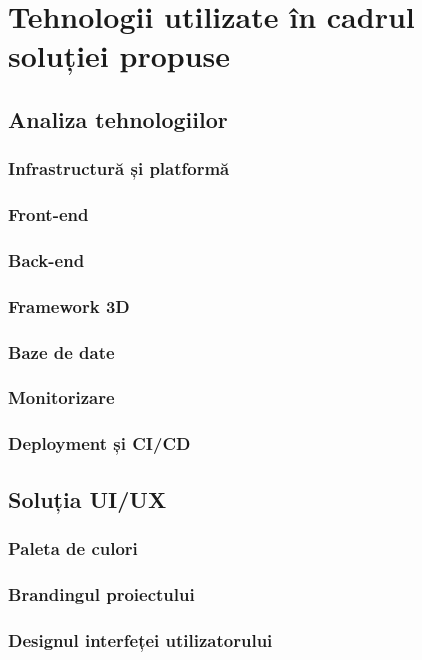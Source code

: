 \chapter{Tehnologii utilizate în cadrul soluției propuse}
\label{chapter:tehnologii}

\section{Analiza tehnologiilor}
\label{sec:proj}
\subsection{Infrastructură și platformă}
\subsection{Front-end}
\subsection{Back-end}
\subsection{Framework 3D}
\subsection{Baze de date}
\subsection{Monitorizare}
\subsection{Deployment și CI/CD}

\section{Soluția UI/UX}
\label{sub-sec:proj-ui-ux}
\subsection{Paleta de culori}
\subsection{Brandingul proiectului}
\subsection{Designul interfeței utilizatorului}
